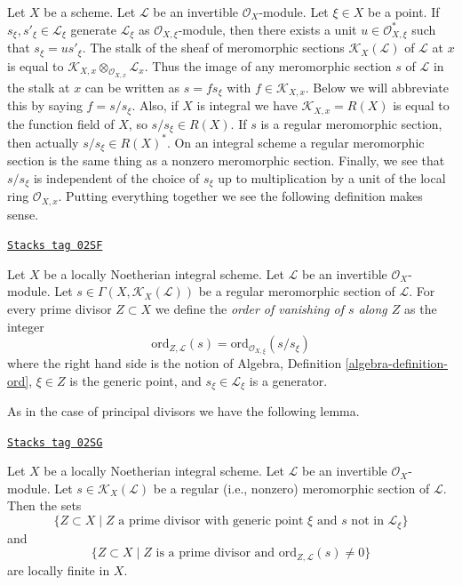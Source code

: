\medskip\noindent
Let $X$ be a scheme. Let $\mathcal{L}$ be an invertible $\mathcal{O}_X$-module.
Let $\xi \in X$ be a point. If $s_\xi, s'_\xi \in \mathcal{L}_\xi$ generate
$\mathcal{L}_\xi$ as $\mathcal{O}_{X, \xi}$-module, then there exists a unit
$u \in \mathcal{O}_{X, \xi}^*$ such that $s_\xi = u s'_\xi$.
The stalk of the sheaf of meromorphic sections
$\mathcal{K}_X(\mathcal{L})$ of $\mathcal{L}$
at $x$ is equal to
$\mathcal{K}_{X, x} \otimes_{\mathcal{O}_{X, x}} \mathcal{L}_x$.
Thus the image of any meromorphic section $s$
of $\mathcal{L}$ in the stalk at $x$ can be written as $s = fs_\xi$ with
$f \in \mathcal{K}_{X, x}$. Below we will abbreviate this by
saying $f = s/s_\xi$. Also, if $X$ is integral we have
$\mathcal{K}_{X, x} = R(X)$ is equal to the function field of $X$,
so $s/s_\xi \in R(X)$. If $s$ is a regular meromorphic section,
then actually $s/s_\xi \in R(X)^*$. On an integral scheme a regular
meromorphic section is the same thing as a nonzero meromorphic section.
Finally, we see that $s/s_\xi$ is independent of the choice of $s_\xi$ up to
multiplication by a unit of the local ring $\mathcal{O}_{X, x}$.
Putting everything together we see the following definition makes sense.

\begin{definition}
\label{divisors-definition-order-vanishing-meromorphic}
\href{https://stacks.math.columbia.edu/tag/02SF}{\texttt{Stacks tag 02SF}}

Let $X$ be a locally Noetherian integral scheme.
Let $\mathcal{L}$ be an invertible $\mathcal{O}_X$-module.
Let $s \in \Gamma(X, \mathcal{K}_X(\mathcal{L}))$
be a regular meromorphic section of $\mathcal{L}$.
For every prime divisor $Z \subset X$ we define the
{\it order of vanishing of $s$ along $Z$} as the integer
$$
\text{ord}_{Z, \mathcal{L}}(s)
= \text{ord}_{\mathcal{O}_{X, \xi}}(s/s_\xi)
$$
where the right hand side is the notion of
Algebra, Definition \ref{algebra-definition-ord},
$\xi \in Z$ is the generic point,
and $s_\xi \in \mathcal{L}_\xi$ is a generator.
\end{definition}

As in the case of principal divisors we have the following lemma.

\begin{lemma}
\label{divisors-lemma-divisor-meromorphic-locally-finite}
\href{https://stacks.math.columbia.edu/tag/02SG}{\texttt{Stacks tag 02SG}}

Let $X$ be a locally Noetherian integral scheme. Let $\mathcal{L}$ be an
invertible $\mathcal{O}_X$-module. Let $s \in \mathcal{K}_X(\mathcal{L})$ be a
regular (i.e., nonzero) meromorphic section of $\mathcal{L}$. Then the sets
$$
\{Z \subset X \mid Z \text{ a prime divisor with generic point }\xi
\text{ and }s\text{ not in }\mathcal{L}_\xi\}
$$
and
$$
\{Z \subset X \mid Z \text{ is a prime divisor and }
\text{ord}_{Z, \mathcal{L}}(s) \not = 0\}
$$
are locally finite in $X$.
\end{lemma}

